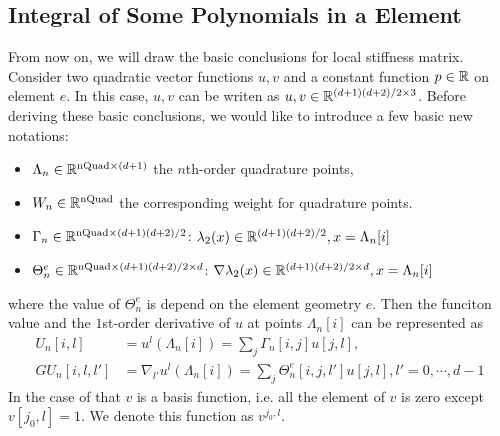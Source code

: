 \subsection{Integral of Some Polynomials in a Element}
From now on, we will draw the basic conclusions for local stiffness matrix. 
Consider two quadratic vector functions $u,v$ and a constant function $p\in\mathbb{R}$ on element $e$.
In this case, $u,v$ can be writen as $u,v\in\mathbb{R}^{(d+1)(d+2)/2\times3}$.
Before deriving these basic conclusions, we would like to introduce a few basic new notations:
\begin{itemize}
  \item $\Lambda_n\in\mathbb{R}^{\text{nQuad}\times (d+1)}$ the $n$th-order quadrature points, 
  \item $W_n\in\mathbb{R}^{\text{nQuad}}$ the corresponding weight for quadrature points.
  \item $\Gamma_n\in\mathbb{R}^{\text{nQuad}\times(d+1)(d+2)/2}$: $\lambda_2(x)\in\mathbb{R}^{(d+1)(d+2)/2}, x=\Lambda_n[i]$ 
  \item $\Theta_n^e\in\mathbb{R}^{\text{nQuad}\times(d+1)(d+2)/2\times d}$: 
$\nabla \lambda_2(x)\in\mathbb{R}^{(d+1)(d+2)/2\times d}, x=\Lambda_n[i]$ 
\end{itemize}
where the value of $\Theta^e_n$ is depend on the element geometry $e$.
Then the funciton value and the $1$st-order derivative of $u$ at points $\Lambda_n[i]$ can be represented as
\[
  \begin{split}
        U_n[i,l] &= u^l(\Lambda_n[i])=\sum_j \Gamma_n[i,j]u[j,l], \\
    GU_n[i,l,l'] &= \nabla_{l'} u^l(\Lambda_n[i])=\sum_j \Theta_n^e[i,j,l']u[j,l],
    l'=0,\cdots,d-1
  \end{split}
\]
In the case of that $v$ is a basis function, i.e. all the element of 
$v$ is zero except $v[j_0,l]=1$.
We denote this function as $v^{j_0,l}$.
